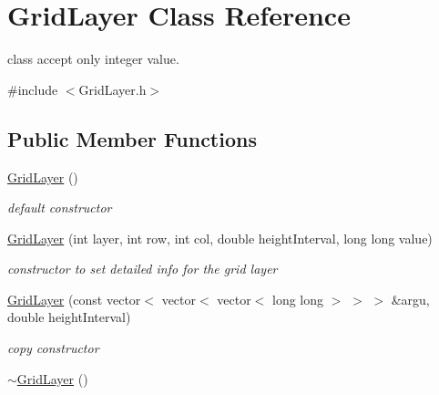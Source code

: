 \hypertarget{classGridLayer}{\section{\-Grid\-Layer \-Class \-Reference}
\label{classGridLayer}
}


class accept only integer value.  




{\ttfamily \#include $<$\-Grid\-Layer.\-h$>$}

\subsection*{\-Public \-Member \-Functions}
\begin{DoxyCompactItemize}
\item 
\hypertarget{classGridLayer_ad58adca9bc030db555ed8e71b41a0332}{\hyperlink{classGridLayer_ad58adca9bc030db555ed8e71b41a0332}{\-Grid\-Layer} ()}\label{classGridLayer_ad58adca9bc030db555ed8e71b41a0332}

\begin{DoxyCompactList}\small\item\em default constructor \end{DoxyCompactList}\item 
\hyperlink{classGridLayer_a7a731b2b9efbae6deab063dd5af83293}{\-Grid\-Layer} (int layer, int row, int col, double height\-Interval, long long value)
\begin{DoxyCompactList}\small\item\em constructor to set detailed info for the grid layer \end{DoxyCompactList}\item 
\hypertarget{classGridLayer_ab4662377f5de2bfe0a554f057187b08d}{\hyperlink{classGridLayer_ab4662377f5de2bfe0a554f057187b08d}{\-Grid\-Layer} (const vector$<$ vector$<$ vector$<$ long long $>$ $>$ $>$ \&argu, double height\-Interval)}\label{classGridLayer_ab4662377f5de2bfe0a554f057187b08d}

\begin{DoxyCompactList}\small\item\em copy constructor \end{DoxyCompactList}\item 
\hypertarget{classGridLayer_a26ef976a6b5e2bc2959404284495619b}{\hyperlink{classGridLayer_a26ef976a6b5e2bc2959404284495619b}{$\sim$\-Grid\-Layer} ()}\label{classGridLayer_a26ef976a6b5e2bc2959404284495619b}


\end{DoxyCompactItemize}
